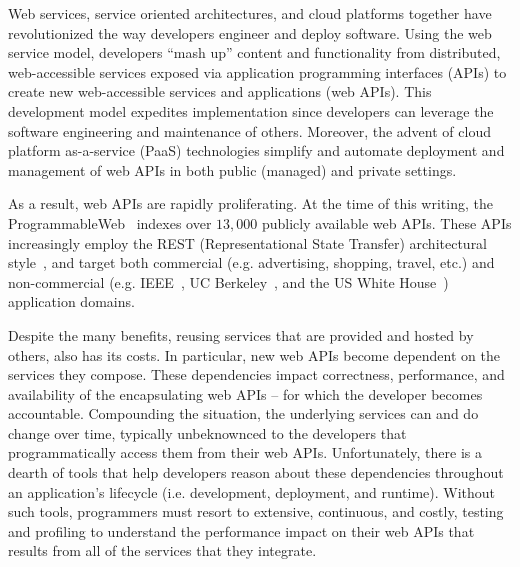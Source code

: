Web services, service oriented architectures, and cloud platforms together have
revolutionized the way developers engineer and deploy software.
Using the web service model, developers ``mash up'' content and functionality 
from distributed, web-accessible services 
exposed via application programming interfaces (APIs)
to create new web-accessible services and applications (web APIs).  
This development model expedites implementation since developers can leverage the 
software engineering and maintenance of others.
Moreover, the advent of cloud platform as-a-service (PaaS) technologies 
simplify and automate deployment and management
of web APIs in both public (managed) and private settings.  

As a result, web APIs are rapidly 
proliferating.  At the time of this writing, 
the ProgrammableWeb~\cite{pweb} indexes over $13,000$
publicly available web APIs.
These APIs increasingly employ the REST (Representational State Transfer) 
architectural style~\cite{Fielding:2000:ASD:932295}, and target both
commercial (e.g. advertising, shopping, travel, etc.) and non-commercial
(e.g. IEEE~\cite{ieeeapis}, UC Berkeley~\cite{ucbapis}, and the US White
House~\cite{whitehouseapis}) application domains.

Despite the many benefits, reusing services that are provided and hosted
by others, also has its costs.  
In particular, new web APIs become dependent on the 
services they compose.  These dependencies
impact correctness, performance, and availability of the encapsulating 
web APIs -- for which the developer becomes accountable.  
Compounding the situation, the underlying services can and do change over time, typically
unbeknownced to the developers that programmatically access them from their web APIs.
Unfortunately, there is a dearth of tools that help developers reason about these 
dependencies throughout an application's 
lifecycle (i.e. development, deployment, and runtime).  Without such tools, 
programmers must resort to extensive, continuous, and costly, testing and profiling 
to understand the performance impact on their web APIs 
that results from all of the services that they integrate.

